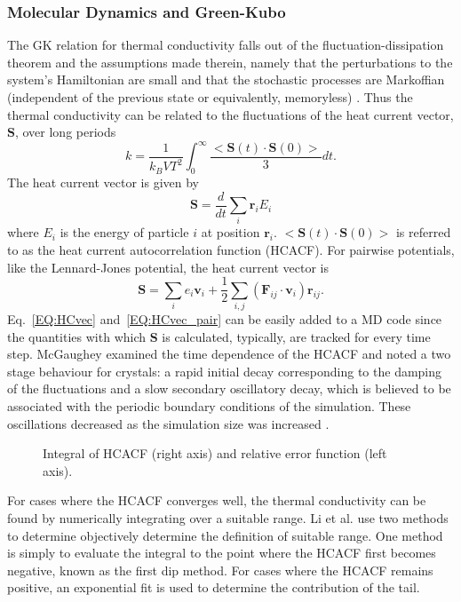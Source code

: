 \subsubsection {Molecular Dynamics and Green-Kubo}

The GK relation for thermal conductivity falls out of the fluctuation-dissipation theorem and the assumptions made therein, namely that the perturbations to the system's Hamiltonian are small and that the stochastic processes are Markoffian (independent of the previous state or equivalently, memoryless) \cite{green:398}. Thus the thermal conductivity can be related to the fluctuations of the heat current vector, $\bm{S}$, over long periods
%
\begin{equation}\label{EQ:intHCACF}
k=\frac{1}{k_B V T^2}\int_0^{\infty}\frac{<\bm{S}(t)\cdot\bm{S}(0)>}{3}dt.
\end{equation}
%
The heat current vector is given by 
%
\begin{equation}\label{EQ:HCvec}
\bm{S}=\frac{d}{dt}\sum_i\bm{r}_iE_i
\end{equation}
%
where $E_i$ is the energy of particle $i$ at position $\bm{r}_i$. $<\bm{S}(t)\cdot\bm{S}(0)>$ is referred to as the heat current autocorrelation function (HCACF). For pairwise potentials, like the Lennard-Jones potential, the heat current vector is
%
\begin{equation}\label{EQ:HCvec_pair}
\bm{S}=\sum_ie_i\bm{v}_i+\frac{1}{2}\sum_{i,j}(\bm{F}_{ij}\cdot\bm{v}_{i})\bm{r}_{ij}.
\end{equation}
%
Eq.~\ref{EQ:HCvec} and~\ref{EQ:HCvec_pair} can be easily added to a MD code since the quantities with which $\bm{S}$ is calculated, typically, are tracked for every time step. McGaughey examined the time dependence of the HCACF and noted a two stage behaviour for crystals: a rapid initial decay corresponding to the damping of the fluctuations and a slow secondary oscillatory decay, which is believed to be associated with the periodic boundary conditions of the simulation. These oscillations decreased as the simulation size was increased \cite{mcgaugheythesis}.
%
\begin{figure}
\begin{center}
\renewcommand{\figure}{Fig.}
\caption{Integral of HCACF (right axis) and relative error function (left axis).}
\label{FIG:GK_bulk}
\end{center}
\end{figure}
%
For cases where the HCACF converges well, the thermal conductivity can be found by numerically integrating over a suitable range. Li et al. \cite{Li1998139} use two methods to determine objectively determine the definition of suitable range. One method is simply to evaluate the integral to the point where the HCACF first becomes negative, known as the first dip method. For cases where the HCACF remains positive, an exponential fit is used to determine the contribution of the tail.

